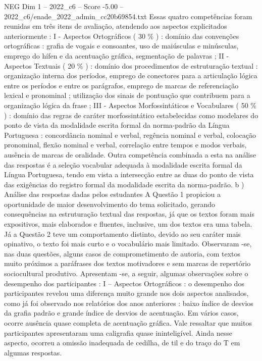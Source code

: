 \begin{textsample}{NEG Dim 1 – 2022\_c6 – Score -5.00 – 2022\_c6/enade\_2022\_admin\_cc20b69854.txt}
Essas quatro competências foram reunidas em três itens de avaliação, atendendo aos aspectos explicitados anteriormente : I - Aspectos Ortográficos ( 30 \% ) : domínio das convenções ortográficas : grafia de vogais e consoantes, uso de maiúsculas e minúsculas, emprego do hífen e da acentuação gráfica, segmentação de palavras ; II - Aspectos Textuais ( 20 \% ) : domínio dos procedimentos de estruturação textual : organização interna dos períodos, emprego de conectores para a articulação lógica entre os períodos e entre os parágrafos, emprego de marcas de referenciação lexical e pronominal ; utilização dos sinais de pontuação que contribuem para a organização lógica da frase ; III - Aspectos Morfossintáticos e Vocabulares ( 50 \% ) : domínio das regras de caráter morfossintático estabelecidas como modelares do ponto de vista da modalidade escrita formal da norma-padrão da Língua Portuguesa : concordância nominal e verbal, regência nominal e verbal, colocação pronominal, flexão nominal e verbal, correlação entre tempos e modos verbais, ausência de marcas de oralidade.
Outra competência combinada a esta na análise das respostas é a seleção vocabular adequada à modalidade escrita formal da Língua Portuguesa, tendo em vista a intersecção entre as duas do ponto de vista das exigências do registro formal da modalidade escrita da norma-padrão. b ) Análise das respostas dadas pelos estudantes A Questão 1 propiciou a oportunidade de maior desenvolvimento do tema solicitado, gerando consequências na estruturação textual das respostas, já que os textos foram mais expositivos, mais elaborados e fluentes, inclusive, um dos textos era uma tabela.
Já a Questão 2 teve um comportamento distinto, devido ao seu caráter mais opinativo, o texto foi mais curto e o vocabulário mais limitado.
Observaram -se, nas duas questões, alguns casos de comprometimento de autoria, com textos muito próximos a paráfrases dos textos motivadores e sem marcas de repertório sociocultural produtivo.
Apresentam -se, a seguir, algumas observações sobre o desempenho dos participantes : I – Aspectos Ortográficos : o desempenho dos participantes revelou uma diferença muito grande nos dois aspectos analisados, como já foi observado nos relatórios dos anos anteriores : baixo índice de desvios da grafia padrão e grande índice de desvios de acentuação.
Em vários casos, ocorre ausência quase completa de acentuação gráfica.
Vale ressaltar que muitos participantes apresentaram uma caligrafia quase ininteligível.
Ainda nesse aspecto, ocorreu a omissão inadequada de cedilha, de til e do traço do T em algumas respostas.

\end{textsample}
